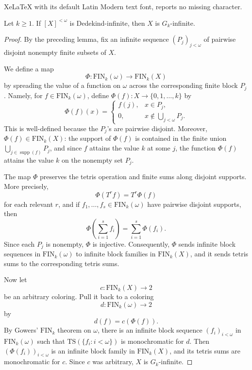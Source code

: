 \documentclass[10pt,a4paper]{amsart}
\DeclareMathOperator{\supp}{supp}
\newcommand{\FIN}{\mathrm{FIN}}
\newcommand{\TS}{\mathrm{TS}}
\begin{document}
XeLaTeX with its default Latin Modern text font, reports no missing character.
\begin{proposition}
Let \(k\geq 1\).  If \([X]^{<\omega}\) is Dedekind-infinite, then \(X\) is \(G_k\)-infinite.
\end{proposition}

\begin{proof}
By the preceding lemma, fix an infinite sequence \((P_j)_{j<\omega}\) of pairwise disjoint nonempty finite subsets of \(X\).

We define a map
\[
    \Phi:\FIN_k(\omega)\to \FIN_k(X)
\]
by spreading the value of a function on \(\omega\) across the corresponding finite block \(P_j\).  Namely, for \(f\in\FIN_k(\omega)\), define \(\Phi(f):X\to\{0,1,\dots,k\}\) by
\[
    \Phi(f)(x)=
    \begin{cases}
        f(j), & x\in P_j,\\
        0, & x\notin \bigcup_{j<\omega}P_j.
    \end{cases}
\]
This is well-defined because the \(P_j\)'s are pairwise disjoint.  Moreover, \(\Phi(f)\in\FIN_k(X)\): the support of \(\Phi(f)\) is contained in the finite union \(\bigcup_{j\in \supp(f)}P_j\), and since \(f\) attains the value \(k\) at some \(j\), the function \(\Phi(f)\) attains the value \(k\) on the nonempty set \(P_j\).

The map \(\Phi\) preserves the tetris operation and finite sums along disjoint supports.  More precisely,
\[
    \Phi(T^r f)=T^r\Phi(f)
\]
for each relevant \(r\), and if \(f_1,\dots,f_s\in\FIN_k(\omega)\) have pairwise disjoint supports, then
\[
    \Phi\left(\sum_{i=1}^s f_i\right)=\sum_{i=1}^s \Phi(f_i).
\]
Since each \(P_j\) is nonempty, \(\Phi\) is injective.  Consequently, \(\Phi\) sends infinite block sequences in \(\FIN_k(\omega)\) to infinite block families in \(\FIN_k(X)\), and it sends tetris sums to the corresponding tetris sums.

Now let
\[
    c:\FIN_k(X)\to 2
\]
be an arbitrary coloring.  Pull it back to a coloring
\[
    d:\FIN_k(\omega)\to 2
\]
by
\[
    d(f)=c(\Phi(f)).
\]
By Gowers' \(\FIN_k\) theorem on \(\omega\), there is an infinite block sequence \((f_i)_{i<\omega}\) in \(\FIN_k(\omega)\) such that \(\TS(\{f_i:i<\omega\})\) is monochromatic for \(d\).  Then \((\Phi(f_i))_{i<\omega}\) is an infinite block family in \(\FIN_k(X)\), and its tetris sums are monochromatic for \(c\).  Since \(c\) was arbitrary, \(X\) is \(G_k\)-infinite.
\end{proof}
\end{document}
